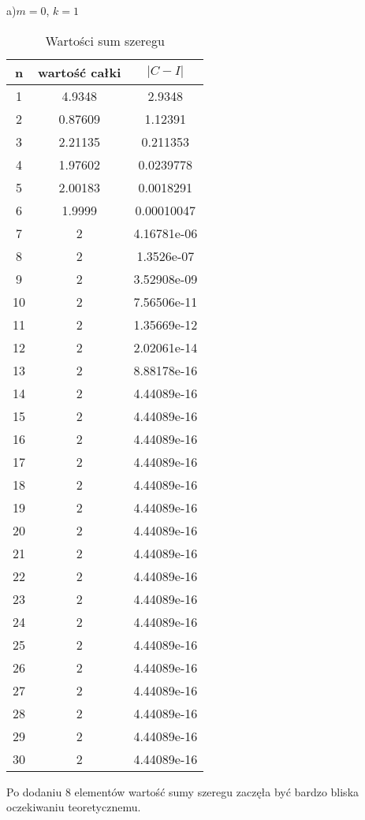 \documentclass{article}
\begin{document}
\newline
a)$m=0$, $k=1$
\begin{table}[H]
\centering
\begin{tabular}{|c|c|c|}
n& wartość całki & $|C−I|$ \\
\hline
1 & 4.9348 & 2.9348\\
2 & 0.87609 & 1.12391\\
3 & 2.21135 & 0.211353\\
4 & 1.97602 & 0.0239778\\
5 & 2.00183 & 0.0018291\\
6 & 1.9999 & 0.00010047\\
7 & 2 & 4.16781e-06\\
8 & 2 & 1.3526e-07\\
9 & 2 & 3.52908e-09\\
10 & 2 & 7.56506e-11\\
11 & 2 & 1.35669e-12\\
12 & 2 & 2.02061e-14\\
13 & 2 & 8.88178e-16\\
14 & 2 & 4.44089e-16\\
15 & 2 & 4.44089e-16\\
16 & 2 & 4.44089e-16\\
17 & 2 & 4.44089e-16\\
18 & 2 & 4.44089e-16\\
19 & 2 & 4.44089e-16\\
20 & 2 & 4.44089e-16\\
21 & 2 & 4.44089e-16\\
22 & 2 & 4.44089e-16\\
23 & 2 & 4.44089e-16\\
24 & 2 & 4.44089e-16\\
25 & 2 & 4.44089e-16\\
26 & 2 & 4.44089e-16\\
27 & 2 & 4.44089e-16\\
28 & 2 & 4.44089e-16\\
29 & 2 & 4.44089e-16\\
30 & 2 & 4.44089e-16
\end{tabular}
\caption{Wartości sum szeregu}
\end{table}
Po dodaniu 8 elementów wartość sumy szeregu zaczęła być bardzo bliska oczekiwaniu teoretycznemu.
\end{document}
